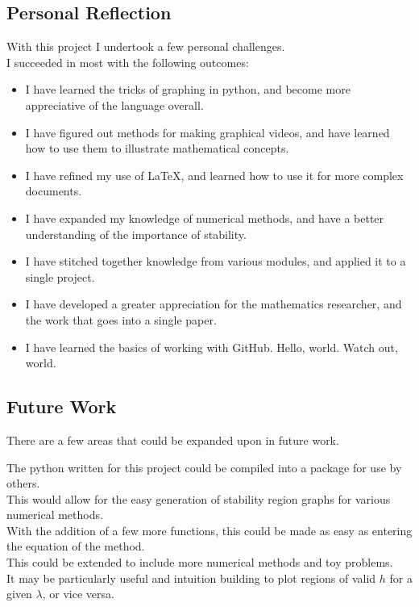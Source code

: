 \subsection{Personal Reflection}
\par With this project I undertook a few personal challenges.\\
I succeeded in most with the following outcomes:\\
\begin{itemize}
    \item I have learned the tricks of graphing in python, and become more appreciative of the language overall.
    \item I have figured out methods for making graphical videos, and have learned how to use them to illustrate mathematical concepts.
    \item I have refined my use of LaTeX, and learned how to use it for more complex documents.
    \item I have expanded my knowledge of numerical methods, and have a better understanding of the importance of stability.
    \item I have stitched together knowledge from various modules, and applied it to a single project.
    \item I have developed a greater appreciation for the mathematics researcher, and the work that goes into a single paper.
    \item I have learned the basics of working with GitHub. Hello, world. Watch out, world.
\end{itemize}

\subsection{Future Work}
\par There are a few areas that could be expanded upon in future work.\\

\par The python written for this project could be compiled into a package for use by others.\\
This would allow for the easy generation of stability region graphs for various numerical methods.\\
With the addition of a few more functions, this could be made as easy as entering the equation of the method.\\
This could be extended to include more numerical methods and toy problems.\\
It may be particularly useful and intuition building to plot regions of valid $h$ for a given $\lambda$, or vice versa.\\


